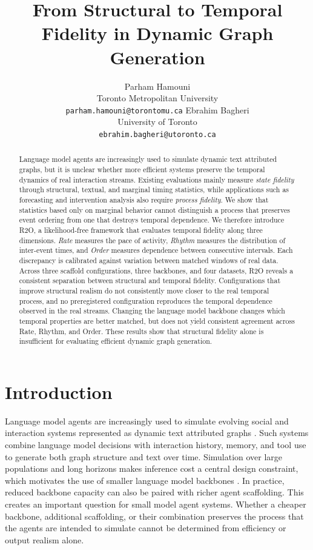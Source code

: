 \documentclass{article}
\title{From Structural to Temporal Fidelity in Dynamic Graph Generation}
\author{%
  Parham Hamouni\\
  Toronto Metropolitan University\\
  \texttt{parham.hamouni@torontomu.ca}
  \And
  Ebrahim Bagheri\\
  University of Toronto\\
  \texttt{ebrahim.bagheri@utoronto.ca}
}
\begin{document}
\maketitle
\begin{abstract}
Language model agents are increasingly used to simulate dynamic text attributed
graphs, but it is unclear whether more efficient systems preserve the temporal
dynamics of real interaction streams. Existing evaluations mainly measure
\emph{state fidelity} through structural, textual, and marginal timing
statistics, while applications such as forecasting and intervention analysis
also require \emph{process fidelity}. We show that statistics based only on
marginal behavior cannot distinguish a process that preserves event ordering
from one that destroys temporal dependence. We therefore introduce R2O, a
likelihood-free framework that evaluates temporal fidelity along three
dimensions. \emph{Rate} measures the pace of activity, \emph{Rhythm} measures
the distribution of inter-event times, and \emph{Order} measures dependence
between consecutive intervals. Each discrepancy is calibrated against
variation between matched windows of real data. Across three scaffold configurations, three backbones, and four datasets,
R2O reveals a consistent separation between structural and temporal fidelity.
Configurations that improve structural realism do not consistently move closer
to the real temporal process, and no preregistered configuration reproduces
the temporal dependence observed in the real streams. Changing the language model backbone changes
which temporal properties are better matched, but does not yield consistent
agreement across Rate, Rhythm, and Order. These results show that structural
fidelity alone is insufficient for evaluating efficient dynamic graph
generation.
\end{abstract}

\section{Introduction}
\label{sec:intro}

Language model agents are increasingly used to simulate evolving social and
interaction systems represented as dynamic text attributed graphs
\citep{zhang2024dtgb,ji2025gag,peng2025gdgb,ji2026graphia}. Such systems combine
language model decisions with interaction history, memory, and tool use to
generate both graph structure and text over time. Simulation over large
populations and long horizons makes inference cost a central design constraint,
which motivates the use of smaller language model backbones
\citep{belcak2025slm,yang2025qwen3}. In practice, reduced backbone capacity can
also be paired with richer agent scaffolding. This creates an important
question for small model agent systems. Whether a cheaper backbone, additional
scaffolding, or their combination preserves the process that the agents are
intended to simulate cannot be determined from efficiency or output realism
alone.
\end{document}
